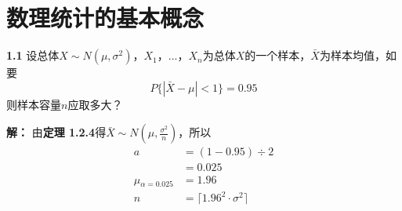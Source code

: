 \section{数理统计的基本概念}

  \textbf{1.1} 设总体$X\sim{}N(\mu{}, \sigma{}^2)$，$X_{1}$，...，$X_{n}$为总体$X$的一个样本，$\bar{X}$为样本均值，如要
  $$ P\{|\bar{X}-\mu{}|<1\} = 0.95 $$
  则样本容量$n$应取多大？
  
  \textbf{解：}
  由\textbf{定理 1.2.4}得$\bar{X}\sim{}N(\mu{}, \frac{\sigma{}^2}{n})$，所以
  \[ \begin{split}
    a &= (1-0.95)\div{2}\\
      &= 0.025\\
    \mu{}_{\alpha{}=0.025} &= 1.96\\
    n &= \lceil{}1.96^2\cdot{}\sigma{}^2\rceil{}
  \end{split} \]
